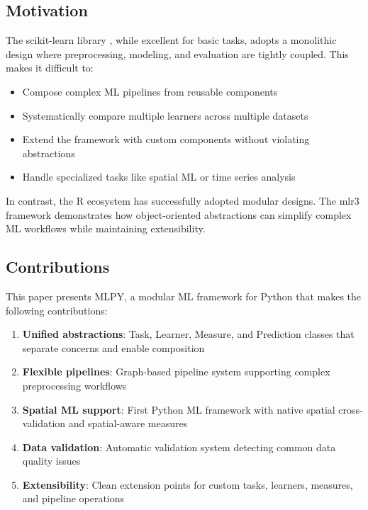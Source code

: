 \documentclass[twoside,11pt]{article}
\begin{document}
\subsection{Motivation}

The scikit-learn library \citep{pedregosa2011scikit}, while excellent for basic
tasks, adopts a monolithic design where preprocessing, modeling, and evaluation
are tightly coupled. This makes it difficult to:
%
\begin{itemize}
  \item Compose complex ML pipelines from reusable components
  \item Systematically compare multiple learners across multiple datasets
  \item Extend the framework with custom components without violating abstractions
  \item Handle specialized tasks like spatial ML or time series analysis
\end{itemize}

In contrast, the R ecosystem has successfully adopted modular designs. The mlr3
framework \citep{lang2019mlr3} demonstrates how object-oriented abstractions can
simplify complex ML workflows while maintaining extensibility.

\subsection{Contributions}

This paper presents MLPY, a modular ML framework for Python that makes the
following contributions:
%
\begin{enumerate}
  \item \textbf{Unified abstractions}: Task, Learner, Measure, and Prediction
        classes that separate concerns and enable composition
  \item \textbf{Flexible pipelines}: Graph-based pipeline system supporting
        complex preprocessing workflows
  \item \textbf{Spatial ML support}: First Python ML framework with native
        spatial cross-validation and spatial-aware measures
  \item \textbf{Data validation}: Automatic validation system detecting common
        data quality issues
  \item \textbf{Extensibility}: Clean extension points for custom tasks, learners,
        measures, and pipeline operations
\end{enumerate}
\end{document}
